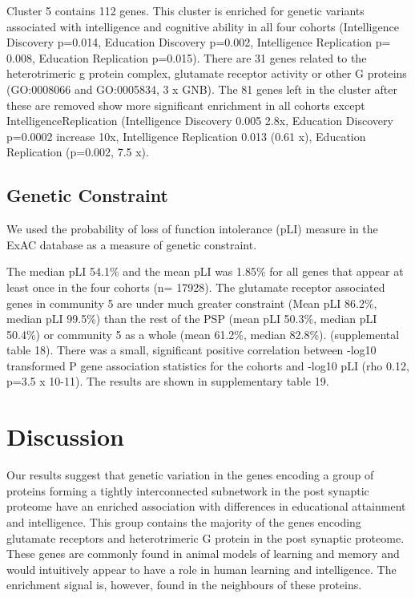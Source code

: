 Cluster 5 contains 112 genes. This cluster is enriched for genetic variants associated with intelligence and cognitive ability in all four cohorts (Intelligence Discovery p=0.014, Education Discovery p=0.002, Intelligence Replication p= 0.008, Education Replication p=0.015). There are 31 genes related to the heterotrimeric g protein complex, glutamate receptor activity or other G proteins (GO:0008066 and GO:0005834, 3 x GNB). The 81 genes left in the cluster after these are removed show more significant enrichment in all cohorts except IntelligenceReplication  (Intelligence Discovery 0.005 2.8x, Education Discovery p=0.0002 increase 10x, Intelligence Replication 0.013 (0.61 x), Education Replication (p=0.002, 7.5 x).
 
\subsection{Genetic Constraint}
We used the probability of loss of function intolerance (pLI) measure in the ExAC database as a measure of genetic constraint. \cite{lek2016analysis} 

The median pLI 54.1\% and the mean pLI was 1.85\% for all genes that appear at least once in the four cohorts (n= 17928). The glutamate receptor associated genes in community 5 are under much greater constraint (Mean pLI 86.2\%, median pLI 99.5\%) than the rest of the PSP (mean pLI 50.3\%, median pLI 50.4\%) or community 5 as a whole (mean 61.2\%, median 82.8\%).
(supplemental table 18). 
There was a small, significant positive correlation between -log10 transformed P gene association statistics for the cohorts and -log10 pLI (rho 0.12, p=3.5 x 10-11). The results are shown in supplementary table 19.

\section{Discussion}
Our results suggest that genetic variation in the genes encoding a group of proteins forming a tightly interconnected subnetwork in the post synaptic proteome have an enriched association with differences in educational attainment and intelligence. This group contains the majority of the genes encoding glutamate receptors and heterotrimeric G protein in the post synaptic proteome. These genes are commonly found in animal models of learning and memory and would intuitively appear to have a role in human learning and intelligence. The enrichment signal is, however, found in the neighbours of these proteins.

